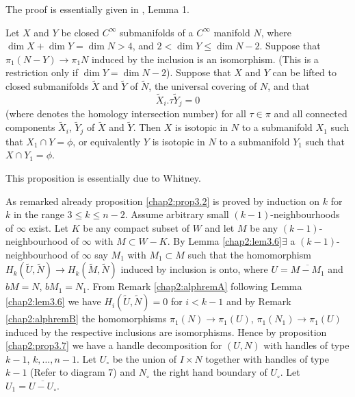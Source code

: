  The proof is essentially given in \cite{c2:key5}, Lemma 1.

 \begin{prop}\label{chap2:prop3.8}%
Let $X$ and $Y$ be closed $C^ \infty$  submanifolds of a $C^ \infty$
manifold $N$, where $\dim X+ \dim Y= \dim N>4$, and $ 2< \dim Y \leq
\dim N-2$. Suppose that $\pi_1(N-Y) \to \pi_1 N $ induced by the
inclusion is an isomorphism. (This is a restriction only if $\dim Y=
\dim  N-2 $). Suppose that $X$ and $Y$ can be lifted to closed
submanifolds $\tilde{X}$ and $\tilde{Y}$ of $\tilde{N}$, the universal
covering of $N$, and that 
$$
\tilde X_i. \tau \tilde{Y}_j = 0
$$
(where denotes the homology intersection number) for all $\tau
\in \pi$ and all connected components $\tilde{X}_i$,
$\tilde{Y}_j$ of $\tilde{X}$ and $\tilde{Y}$. Then $X$ is isotopic in
$N$ to a submanifold $X_1$ such that $X_1 \cap Y = \phi$, or
equivalently $Y$ is isotopic in $N$ to a submanifold $Y_1$ such that
$X \cap Y_1 = \phi$. 
 \end{prop}

This proposition is essentially due to Whitney.

As remarked already proposition \ref{chap2:prop3.2} is proved by induction on $k$ for
$k$ in the range $3 \leq k \leq n-2$. Assume arbitrary small
$(k-1)$-neighbourhoods of $\infty$ exist. Let $K$ be any compact
subset of $W$ and let $M$ be any $(k-1)$-neighbourhood of $\infty$
with $ M \subset W-K$. By Lemma \ref{chap2:lem3.6}\pageoriginale $\exists$ a
$(k-1)$-neighbourhood 
of $\infty$ say $M_1$ with $M_1 \subset M$ such that the homomorphism
$H_k (\tilde{U}, \tilde{N}) \to H_k (\tilde{M}, \tilde{N})$ induced by
inclusion is onto, where $U =\overline{M - M_1}$ and $ bM = N$, $bM_1
= N_1$. From Remark \ref{chap2:alphremA} following Lemma
\ref{chap2:lem3.6} we have $H_i 
(\tilde {U}, \tilde {N}) = 0$ for $i <  k-1$ and by Remark
\ref{chap2:alphremB} the homomorphisms $\pi_1(N) \to \pi_1(U)$, 
$\pi_1(N_1) \to \pi_1(U) $ induced by the respective inclusions are
isomorphisms. Hence by proposition \ref{chap2:prop3.7} we have a handle
decomposition for $(U, N)$ with handles of type $k - 1$, $k, \ldots,
n-1$. Let $U_\circ$ be the union of $I \times N$ together with handles of
type $k-1$ (Refer to diagram 7) and $N_\circ$ the right hand boundary of
$U_\circ$. Let $U_1 = \overline{U-U_\circ}$. 

